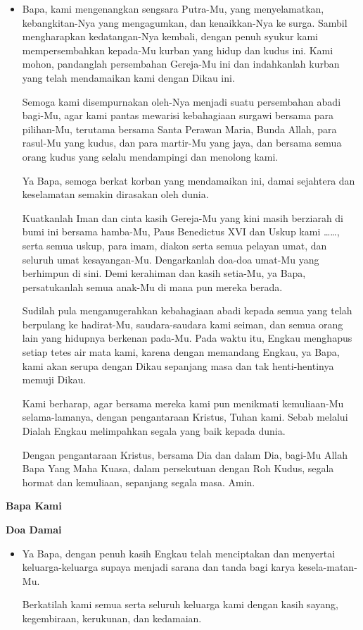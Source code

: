 \documentclass[a5paper,headsepline,titlepage,10pt,normalheadings,DIVcalc]{scrbook}
\makeatletter
\newcommand{\subjudul}[1]{%
  {\parindent \z@ \normalfont
    \interlinepenalty\@M \bfseries #1\par\nobreak \vskip 20\p@ }}
\newcommand{\BI}[1]{\begin{itemize} \item[I:] #1 \end{itemize}}
\makeatother
\begin{document}
\BI{Bapa, kami mengenangkan sengsara Putra-Mu, yang menyelamatkan, kebangkitan-Nya yang mengagumkan, dan kenaikkan-Nya ke surga. Sambil mengharapkan kedatangan-Nya kembali, dengan penuh syukur kami mempersembahkan kepada-Mu kurban yang hidup dan kudus ini. Kami mohon, pandanglah persembahan Gereja-Mu ini dan indahkanlah kurban yang telah mendamaikan kami dengan Dikau ini.

Semoga kami disempurnakan oleh-Nya menjadi suatu persembahan abadi bagi-Mu, agar kami pantas mewarisi kebahagiaan surgawi bersama para pilihan-Mu, terutama bersama Santa Perawan Maria, Bunda Allah, para rasul-Mu yang kudus, dan para martir-Mu yang jaya, dan bersama semua orang kudus yang selalu mendampingi dan menolong kami.

Ya Bapa, semoga berkat korban yang mendamaikan ini, damai sejahtera dan keselamatan semakin dirasakan oleh dunia.

Kuatkanlah Iman dan cinta kasih Gereja-Mu yang kini masih berziarah di bumi ini bersama hamba-Mu, Paus Benedictus XVI dan Uskup kami \dots \dots, serta semua uskup, para imam, diakon serta semua pelayan umat, dan seluruh umat kesayangan-Mu. Dengarkanlah doa-doa umat-Mu yang berhimpun di sini. Demi kerahiman dan kasih setia-Mu, ya Bapa, persatukanlah semua anak-Mu di mana pun mereka berada.

Sudilah pula menganugerahkan kebahagiaan abadi kepada semua yang telah berpulang ke hadirat-Mu, saudara-saudara kami seiman, dan semua orang lain yang hidupnya berkenan pada-Mu. Pada waktu itu, Engkau menghapus setiap tetes air mata kami, karena dengan memandang Engkau, ya Bapa, kami akan serupa dengan Dikau sepanjang masa dan tak henti-hentinya memuji Dikau.

Kami berharap, agar bersama mereka kami pun menikmati kemuliaan-Mu selama-lamanya, dengan pengantaraan Kristus, Tuhan kami. Sebab melalui Dialah Engkau melimpahkan segala yang baik kepada dunia.

Dengan pengantaraan Kristus, bersama Dia dan dalam Dia, bagi-Mu Allah Bapa Yang Maha Kuasa, dalam persekutuan dengan Roh Kudus, segala hormat dan kemuliaan, sepanjang segala masa. Amin.}

\subjudul{Bapa Kami}

\subjudul{Doa Damai}

\BI{Ya Bapa, dengan penuh kasih Engkau telah menciptakan dan menyertai keluarga-keluarga supaya menjadi sarana dan tanda bagi karya kesela-matan-Mu.

Berkatilah kami semua serta seluruh keluarga kami dengan kasih sayang, kegembiraan, kerukunan, dan kedamaian.}
\end{document}
